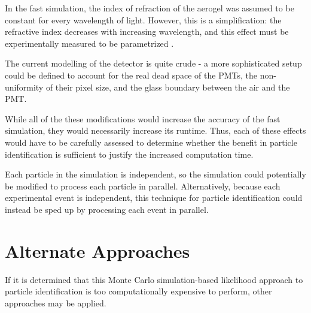 In the fast simulation, the index of refraction of the aerogel was assumed to be constant for every wavelength of light.
However, this is a simplification: the refractive index decreases with increasing wavelength, and this effect must be experimentally measured to be parametrized \cite{aerogelrefrac}.

The current modelling of the detector is quite crude - a more sophisticated setup could be defined to account for the real dead space of the PMTs, the non-uniformity of their pixel size, and the glass boundary between the air and the PMT.

While all of the these modifications would increase the accuracy of the fast simulation, they would necessarily increase its runtime. 
Thus, each of these effects would have to be carefully assessed to determine whether the benefit in particle identification is sufficient to justify the increased computation time.

Each particle in the simulation is independent, so the simulation could potentially be modified to process each particle in parallel. 
Alternatively, because each experimental event is independent, this technique for particle identification could instead be sped up by processing each event in parallel.

\section{Alternate Approaches}
If it is determined that this Monte Carlo simulation-based likelihood approach to particle identification is too computationally expensive to perform, other approaches may be applied.


\endinput 

Any text after an \endinput is ignored.
You could put scraps here or things in progress.



MULTIPARTICLE:

To find out what these multi-particle events may look like in a typical experiment, the Geant4 simulation of EMPHATIC was used to simulate a beam of 10,000 protons with a momentum of 30 GeV/c.
The protons were generated directly upstream of a 5.0 cm $\times$ 5.0 cm, 2.0 cm thick carbon target, and were directed along the $z$-axis of the experiment.
Geant4 libraries were included to account for elastic scattering, particle decays, hadron physics, stopping physics, and Cherenkov radiation, among other processes. 
The output of the simulation contains information about the identities and trajectories of the particles involved. 
Of interest to this project are specifically the instances where a secondary charged particle enters the aerogel at a velocity sufficient to produce Cherenkov photons.

